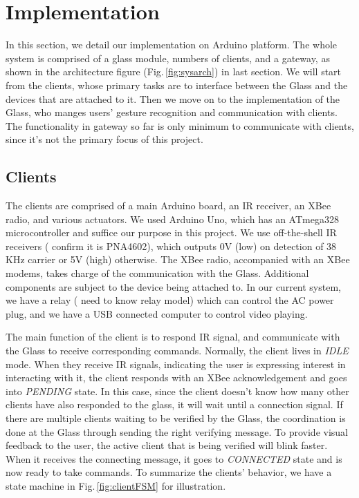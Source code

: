 \section{Implementation}
\label{sec:implementation}

In this section, we detail our implementation on Arduino \cite{Arduino} platform. The whole system is comprised of a glass module, numbers of clients, and a gateway, as shown in the architecture figure (Fig.\,\ref{fig:sysarch}) in last section. We will start from the clients, whose primary tasks are to interface between the Glass and the devices that are attached to it. Then we move on to the implementation of the Glass, who manges users' gesture recognition and communication with clients. The functionality in gateway so far is only minimum to communicate with clients, since it's not the primary focus of this project.

\subsection{Clients}
The clients are comprised of a main Arduino board, an IR receiver, an XBee radio, and various actuators. We used Arduino Uno, which has an ATmega328 microcontroller and suffice our purpose in this project. We use off-the-shell IR receivers ({\color{red} confirm it is PNA4602}), which outputs 0V (low) on detection of 38 KHz carrier or 5V (high) otherwise. The XBee radio, accompanied with an XBee modems, takes charge of the communication with the Glass. Additional components are subject to the device being attached to. In our current system, we have a relay ({\color{red} need to know relay model}) which can control the AC power plug, and we have a USB connected computer to control video playing.

The main function of the client is to respond IR signal, and communicate with the Glass to receive corresponding commands. Normally, the client lives in {\it IDLE} mode. When they receive IR signals, indicating the user is expressing interest in interacting with it, the client responds with an XBee acknowledgement and goes into {\it PENDING} state. In this case, since the client doesn't know how many other clients have also responded to the glass, it will wait until a connection signal. If there are multiple clients waiting to be verified by the Glass, the coordination is done at the Glass through sending the right verifying message. To provide visual feedback to the user, the active client that is being verified will blink faster. When it receives the connecting message, it goes to {\it CONNECTED} state and is now ready to take commands. To summarize the clients' behavior, we have a state machine in Fig.\,\ref{fig:clientFSM} for illustration.

